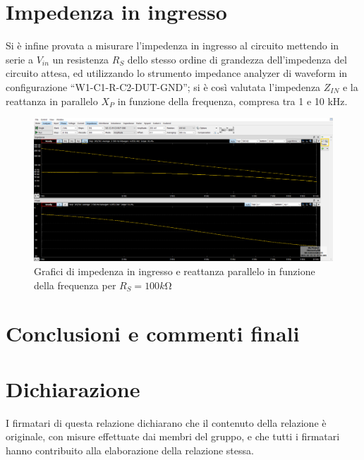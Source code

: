 \documentclass[10pt, a4paper, italian]{article}
\begin{document}
\section{Impedenza in ingresso}
Si è infine provata a misurare l'impedenza in ingresso al circuito mettendo in serie a $V_{in}$ un resistenza $R_S$ dello stesso ordine di grandezza dell'impedenza del circuito attesa, ed utilizzando lo strumento impedance analyzer di waveform in configurazione “W1-C1-R-C2-DUT-GND”; si è così valutata l'impedenza $Z_{IN}$ e la reattanza in parallelo $X_P$ in funzione della frequenza, compresa tra 1 e 10 kHz.
\begin{figure}[H]
    \centering
	\includegraphics[scale=0.4]{impedance}
    \caption{Grafici di impedenza in ingresso e reattanza parallelo in funzione della frequenza per $R_S=100 \si{k\ohm}$}
\end{figure}
\section*{Conclusioni e commenti finali}


\section*{Dichiarazione}
I firmatari di questa relazione dichiarano che il contenuto della relazione \`e
originale, con misure effettuate dai membri del gruppo, e che tutti i firmatari
hanno contribuito alla elaborazione della relazione stessa.
\end{document}
